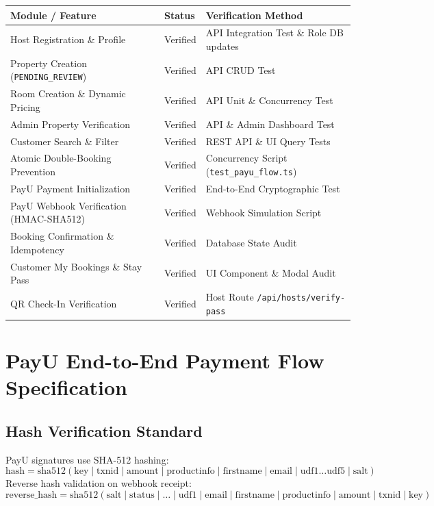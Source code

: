 \documentclass[11pt,a4paper]{article}
\begin{document}
\begin{longtable}{@{}lll@{}}
\toprule
\textbf{Module / Feature} & \textbf{Status} & \textbf{Verification Method} \\ \midrule
Host Registration \& Profile & Verified & API Integration Test \& Role DB updates \\
Property Creation (\texttt{PENDING\_REVIEW}) & Verified & API CRUD Test \\
Room Creation \& Dynamic Pricing & Verified & API Unit \& Concurrency Test \\
Admin Property Verification & Verified & API \& Admin Dashboard Test \\
Customer Search \& Filter & Verified & REST API \& UI Query Tests \\
Atomic Double-Booking Prevention & Verified & Concurrency Script (\texttt{test\_payu\_flow.ts}) \\
PayU Payment Initialization & Verified & End-to-End Cryptographic Test \\
PayU Webhook Verification (HMAC-SHA512) & Verified & Webhook Simulation Script \\
Booking Confirmation \& Idempotency & Verified & Database State Audit \\
Customer My Bookings \& Stay Pass & Verified & UI Component \& Modal Audit \\
QR Check-In Verification & Verified & Host Route \texttt{/api/hosts/verify-pass} \\ \bottomrule
\end{longtable}

\section{PayU End-to-End Payment Flow Specification}

\subsection{Hash Verification Standard}
PayU signatures use SHA-512 hashing:
\begin{equation}
\text{hash} = \text{sha512}(\text{key} \mid \text{txnid} \mid \text{amount} \mid \text{productinfo} \mid \text{firstname} \mid \text{email} \mid \text{udf1} \dots \text{udf5} \mid \text{salt})
\end{equation}
Reverse hash validation on webhook receipt:
\begin{equation}
\text{reverse\_hash} = \text{sha512}(\text{salt} \mid \text{status} \mid \dots \mid \text{udf1} \mid \text{email} \mid \text{firstname} \mid \text{productinfo} \mid \text{amount} \mid \text{txnid} \mid \text{key})
\end{equation}
\end{document}
